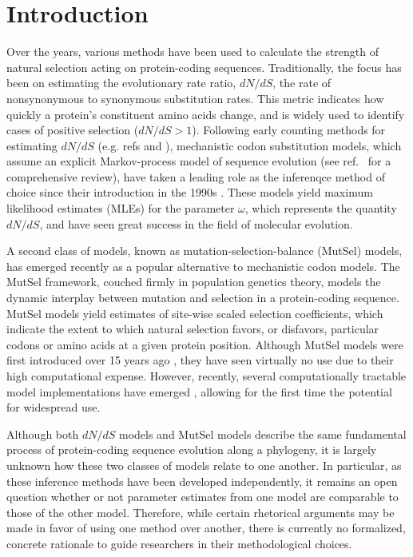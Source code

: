 \documentclass[11pt]{article}
\begin{document}
\section*{Introduction}

Over the years, various methods have been used to calculate the strength of natural selection acting on protein-coding sequences. Traditionally, the focus has been on estimating the evolutionary rate ratio, $dN/dS$, the rate of nonsynonymous to synonymous substitution rates. This metric indicates how quickly a protein's constituent amino acids change, and is widely used to identify cases of positive selection ($dN/dS > 1$). Following early counting methods for estimating $dN/dS$ (e.g. refs \cite{LWL85} and \cite{NG86}), mechanistic codon substitution models, which assume an explicit Markov-process model of sequence evolution (see ref.~\cite{Anisimova2009} for a comprehensive review), have taken a leading role as the inferenqce method of choice since their introduction in the 1990s \cite{GoldmanYang1994, MuseGaut1994, NielsenYang1998}. These models yield maximum likelihood estimates (MLEs) for the parameter $\omega$, which represents the quantity $dN/dS$, and have seen great success in the field of molecular evolution. 

A second class of models, known as mutation-selection-balance (MutSel) models, has emerged recently as a popular alternative to mechanistic codon models. The MutSel framework, couched firmly in population genetics theory, models the dynamic interplay between mutation and selection in a protein-coding sequence. MutSel models yield estimates of site-wise scaled selection coefficients, which indicate the extent to which natural selection favors, or disfavors, particular codons or amino acids at a given protein position. Although MutSel models were first introduced over 15 years ago \cite{HalpernBruno1998}, they have seen virtually no use due to their high computational expense. However, recently, several computationally tractable model implementations have emerged \cite{RodrigueLartillot2014,Tamurietal2014}, allowing for the first time the potential for widespread use. 

Although both $dN/dS$ models and MutSel models describe the same fundamental process of protein-coding sequence evolution along a phylogeny, it is largely unknown how these two classes of models relate to one another. In particular, as these inference methods have been developed independently, it remains an open question whether or not parameter estimates from one model are comparable to those of the other model. Therefore, while certain rhetorical arguments may be made in favor of using one method over another, there is currently no formalized, concrete rationale to guide researchers in their methodological choices. 
\end{document}
